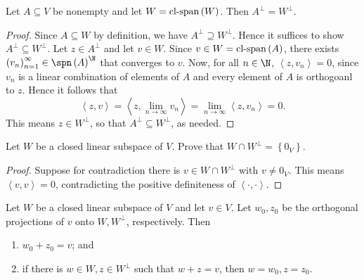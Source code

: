 \documentclass[pmath450]{subfiles}
\begin{document}
    \begin{prop}{}
        Let $A\subseteq V$ be nonempty and let $W=\operatorname{cl-span}\left( W \right)$. Then $A^{\perp}=W^{\perp}$.
    \end{prop}
    
    \begin{proof}
        Since $A\subseteq W$ by definition, we have $A^{\perp}\supseteq W^{\perp}$. Hence it suffices to show $A^{\perp}\subseteq W^{\perp}$. Let $z\in A^{\perp}$ and let $v\in W$. Since $v\in W = \operatorname{cl-span}\left( A \right)$, there exists $\left( v_{n} \right)^{\infty}_{n=1}\in\spn\left( A \right)^{\N}$ that converges to $v$. Now, for all $n\in\N$, $\left\langle z, v_n\right\rangle=0$, since $v_n$ is a linear combination of elements of $A$ and every element of $A$ is orthogoanl to $z$. Hence it follows that
        \begin{equation*}
            \left\langle z, v\right\rangle = \left\langle z, \lim_{n\to\infty}v_n\right\rangle = \lim_{n\to\infty}\left\langle z, v_n\right\rangle = 0.
        \end{equation*}
        This means $z\in W^{\perp}$, so that $A^{\perp}\subseteq W^{\perp}$, as needed.
    \end{proof}
    
    \begin{exercise}{}
        Let $W$ be a closed linear subspace of $V$. Prove that $W\cap W^{\perp}=\left\lbrace 0_V \right\rbrace$.
    \end{exercise}
    
    \begin{proof}
        Suppose for contradiction there is $v\in W\cap W^{\perp}$ with $v\neq 0_V$. This means $\left\langle v, v\right\rangle=0$, contradicting the positive definiteness of $\left\langle \cdot, \cdot\right\rangle$.
    \end{proof}
    
    \begin{prop}{}
        Let $W$ be a closed linear subspace of $V$ and let $v\in V$. Let $w_0,z_0$ be the orthogonal projections of $v$ onto $W,W^{\perp}$, respectively. Then
        \begin{enumerate}
            \item $w_0+z_0=v$; and
            \item if there is $w\in W, z\in W^{\perp}$ such that $w+z=v$, then $w=w_0, z=z_0$.
        \end{enumerate}
    \end{prop}
\end{document}
